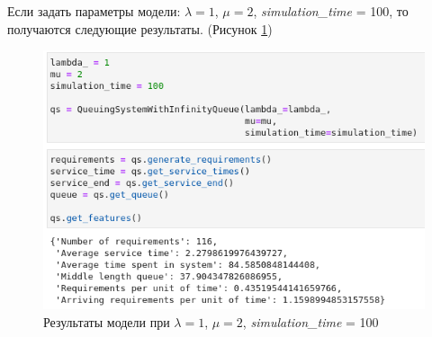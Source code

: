 \documentclass[14pt,fleqn]{extarticle}
\begin{document}
	\newpage
	Если задать параметры модели: $\lambda = 1$, $\mu = 2$, \textit{simulation\textup{\_}time} = 100, то получаются следующие результаты. (Рисунок \ref{fig:queuing_system_with_infinity_queue_result})
	\begin{figure}[h]
		\centering \includegraphics[scale=0.62]{queuing_system_with_infinity_queue_result}
		\caption{Результаты модели при $\lambda = 1$, $\mu = 2$, \textit{simulation\textup{\_}time} = 100}
		\label{fig:queuing_system_with_infinity_queue_result}
	\end{figure}
\end{document}

